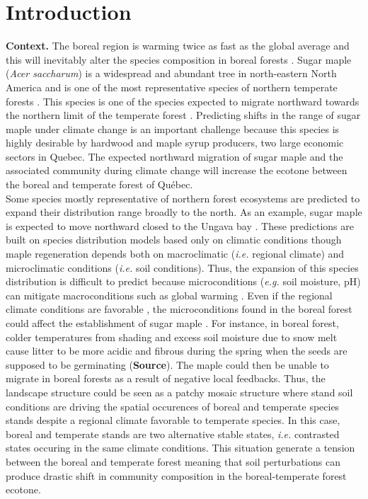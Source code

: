 


\newpage
\setcounter{page}{1}

\section{Introduction}

\textbf{Context.}  The boreal region is warming twice as fast as the global
average and  this will inevitably alter the species composition in boreal
forests \cite{Scheffer2012,Hughes2000}. Sugar maple (\textit{Acer saccharum})
is a widespread and abundant tree in north-eastern North America and is one of
the most representative species of northern temperate forests
\cite{Graignic2013,Messaoud2007,Kellman2004,Barras1998}. This species is one
of the species expected to migrate northward towards the northern limit of the
temperate forest \cite{McKENNEY2007,Goldblum2005}. Predicting shifts in the
range of sugar maple under climate change is an important challenge because
this species is highly desirable by hardwood and maple syrup producers, two
large economic sectors in Quebec. The expected northward migration of sugar
maple and the associated community during climate change will increase the
ecotone between the boreal and temperate forest of Québec.\\

Some species mostly representative of northern forest ecosystems are predicted
to expand their distribution range broadly to the north. As an example, sugar
maple is expected to move northward closed to the Ungava bay
\cite{McKENNEY2007}. These predictions are built on species distribution models
based only on climatic conditions though maple regeneration depends both on
macroclimatic (\textit{i.e.} regional climate) and microclimatic conditions
(\textit{i.e.} soil conditions). Thus, the expansion of this species
distribution is difficult to predict because microconditions (\textit{e.g.}
soil moisture, pH) can mitigate macroconditions such as global warming
\cite{DeFrenne2013}. Even if the regional climate conditions are favorable
\cite{Kellman2004}, the microconditions found in the boreal forest could
affect the establishment of sugar maple
\cite{Kellman2004,Moore2008,DeFrenne2013,Barras1998}. For instance, in boreal
forest, colder temperatures from shading and excess soil moisture due to snow
melt cause litter to be more acidic and fibrous during the spring  when the
seeds are supposed to be germinating (\textbf{Source}). The maple could then
be unable to migrate in boreal forests as a result of negative local
feedbacks. Thus, the landscape structure could be seen as a patchy mosaic
structure where stand soil conditions are driving the spatial occurences of
boreal and temperate species stands despite a regional climate favorable to
temperate species. In this case, boreal and temperate stands are two
alternative stable states, \textit{i.e.} contrasted states occuring in the
same climate conditions. This situation generate a tension between the boreal
and temperate forest meaning that soil perturbations can produce drastic shift
in community composition in the boreal-temperate forest ecotone.

